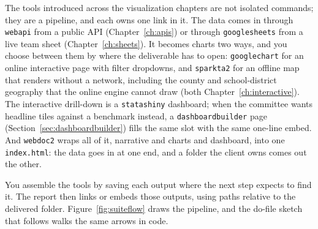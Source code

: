 The tools introduced across the visualization chapters are not isolated commands; they are a pipeline, and each owns one link in it. The data comes in through \texttt{webapi} from a public API (Chapter~\ref{ch:apis}) or through \texttt{googlesheets} from a live team sheet (Chapter~\ref{ch:sheets}). It becomes charts two ways, and you choose between them by where the deliverable has to open: \texttt{googlechart} for an online interactive page with filter dropdowns, and \texttt{sparkta2} for an offline map that renders without a network, including the county and school-district geography that the online engine cannot draw (both Chapter~\ref{ch:interactive}). The interactive drill-down is a \texttt{statashiny} dashboard; when the committee wants headline tiles against a benchmark instead, a \texttt{dashboardbuilder} page (Section~\ref{sec:dashboardbuilder}) fills the same slot with the same one-line embed. And \texttt{webdoc2} wraps all of it, narrative and charts and dashboard, into one \texttt{index.html}: the data goes in at one end, and a folder the client owns comes out the other.

You assemble the tools by saving each output where the next step expects to find it. The report then links or embeds those outputs, using paths relative to the delivered folder. Figure~\ref{fig:suiteflow} draws the pipeline, and the do-file sketch that follows walks the same arrows in code.

